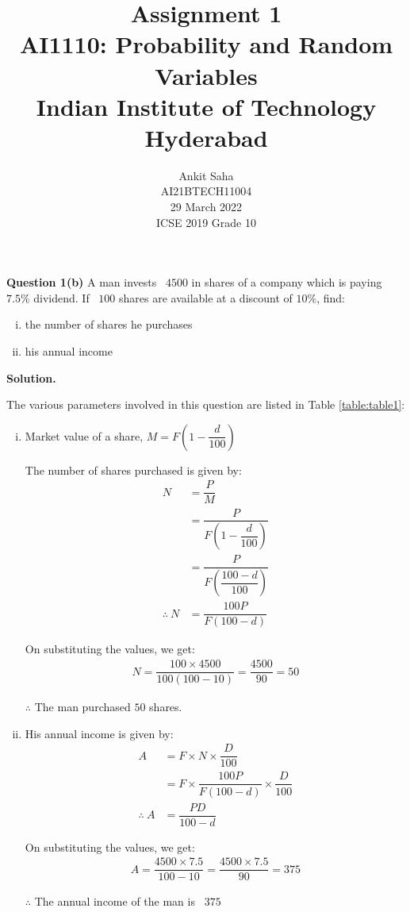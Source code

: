 \documentclass[journal,12pt,twocolumn]{IEEEtran}
\title{Assignment 1 \\ \Large AI1110: Probability and Random Variables \\ \large Indian Institute of Technology Hyderabad}
\author{Ankit Saha \\ \normalsize AI21BTECH11004 \\ \vspace*{20pt} \normalsize  29 March 2022 \\ \vspace*{20pt} \Large ICSE 2019 Grade 10}
\begin{document}
	\maketitle
	
	\textbf{Question 1(b)} 
	A man invests \rupee~$4500$ in shares of a company which is paying $7.5\%$ dividend. If \rupee~$100$ shares are available at a discount of $10\%$, find:
	\begin{enumerate}[(i)]
		\item the number of shares he purchases
		\item his annual income
	\end{enumerate}	
	
	\textbf{Solution.}
	
	The various parameters involved in this question are listed in Table \eqref{table:table1}:
	\begin{table}[ht!]
		
		\vspace*{5pt}
		\caption{}
		\label{table:table1}	
	\end{table}
	
	\begin{enumerate}[(i)]
		\item Market value of a share, $M = F \left(1 - \dfrac{d}{100} \right)$
		
		The number of shares purchased is given by: 		
		\begin{align}
			N &= \dfrac{P}{M} \\ 
			&= \dfrac{P}{F \left(1 - \dfrac{d}{100} \right)} \\
			&= \dfrac{P}{F \left(\dfrac{100 - d}{100} \right)} \\
 			\therefore~N &= \dfrac{100P}{F(100-d)}
		\end{align}
		
		On substituting the values, we get:
		\begin{align}
			N = \dfrac{100 \times 4500}{100(100 - 10)} = \dfrac{4500}{90} = 50
		\end{align}
		
		$\therefore$ The man purchased $50$ shares.
		
		\item His annual income is given by:
		\begin{align}
		 	A &= F \times N \times \dfrac{D}{100} \\ 
		 	&= F \times \dfrac{100P}{F(100-d)} \times \dfrac{D}{100} \\ 
		 	\therefore~A &= \dfrac{PD}{100-d}
		 \end{align}
		 
		 On substituting the values, we get:
		\begin{align}
			A = \dfrac{4500 \times 7.5}{100 - 10} = \dfrac{4500 \times 7.5}{90} = 375
		\end{align}
		
		$\therefore$ The annual income of the man is \rupee~$375$		
		
	\end{enumerate}
			
\end{document}
